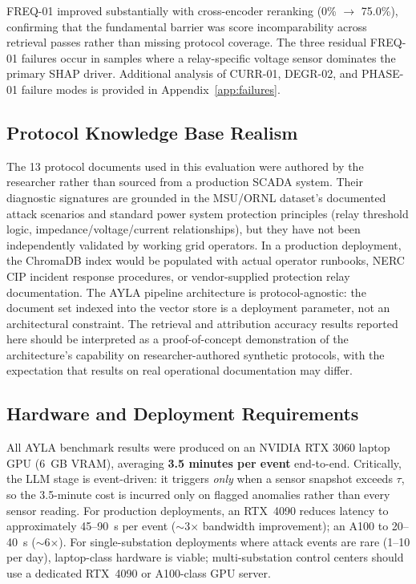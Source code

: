 \documentclass[twocolumn, 10pt, letterpaper]{article}
\begin{document}
FREQ-01 improved substantially with cross-encoder reranking (0\% $\to$ 75.0\%),
confirming that the fundamental barrier was score incomparability across retrieval
passes rather than missing protocol coverage.
The three residual FREQ-01 failures occur in samples where a relay-specific
voltage sensor dominates the primary SHAP driver.
Additional analysis of CURR-01, DEGR-02, and PHASE-01 failure modes is provided
in Appendix~\ref{app:failures}.

\subsection{Protocol Knowledge Base Realism}

The 13 protocol documents used in this evaluation were authored by the researcher
rather than sourced from a production SCADA system.
Their diagnostic signatures are grounded in the MSU/ORNL dataset's documented
attack scenarios \cite{morris2014ics} and standard power system protection
principles (relay threshold logic, impedance/voltage/current relationships),
but they have not been independently validated by working grid operators.
In a production deployment, the ChromaDB index would be populated with actual
operator runbooks, NERC CIP incident response procedures, or vendor-supplied
protection relay documentation.
The AYLA pipeline architecture is protocol-agnostic: the document set indexed
into the vector store is a deployment parameter, not an architectural constraint.
The retrieval and attribution accuracy results reported here should be interpreted
as a proof-of-concept demonstration of the architecture's capability on
researcher-authored synthetic protocols, with the expectation that results
on real operational documentation may differ.

\subsection{Hardware and Deployment Requirements}

All AYLA benchmark results were produced on an NVIDIA RTX 3060 laptop GPU
(6~GB VRAM), averaging \textbf{3.5 minutes per event} end-to-end.
Critically, the LLM stage is event-driven: it triggers \textit{only} when a sensor
snapshot exceeds $\tau$, so the 3.5-minute cost is incurred only on flagged anomalies
rather than every sensor reading.
For production deployments, an RTX~4090 reduces latency to approximately 45--90~s
per event ($\sim$3$\times$ bandwidth improvement); an A100 to 20--40~s
($\sim$6$\times$).
For single-substation deployments where attack events are rare (1--10 per day),
laptop-class hardware is viable; multi-substation control centers should use a
dedicated RTX~4090 or A100-class GPU server.
\end{document}
